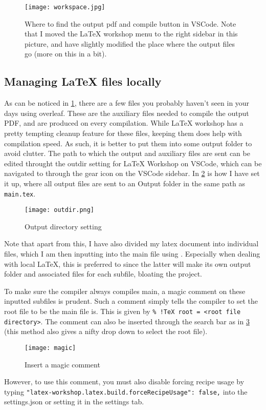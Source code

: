 \begin{figure}[ht!]
    \centering
    \texttt{[image: workspace.jpg]}
    \caption{Where to find the output pdf and compile button in VSCode. Note that I moved the LaTeX workshop menu to the right sidebar in this picture, and have slightly modified the place where the output files go (more on this in a bit).}
    \label{fig:workspace}
\end{figure}


\newpage
\subsection{Managing \LaTeX{} files locally}

As can be noticed in \cref{fig:workspace}, there are a few files you probably haven't seen in your days using overleaf. These are the auxiliary files needed to compile the output PDF, and are produced on every compilation. While LaTeX workshop has a pretty tempting cleanup feature for these files, keeping them does help with compilation speed. As such, it is better to put them into some output folder to avoid clutter. The path to which the output and auxiliary files are sent can be edited throught the outdir setting for LaTeX Workshop on VSCode, which can be navigated to through the gear icon on the VSCode sidebar. In \cref{fig:outdir} is how I have set it up, where all output files are sent to an Output folder in the same path as \verb|main.tex|.
\begin{figure}[ht!]
    \centering
    \texttt{[image: outdir.png]}
    \caption{Output directory setting}
    \label{fig:outdir}
\end{figure}

Note that apart from this, I have also divided my latex document into individual files, which I am then inputting into the main file using \verb||. Especially when dealing with local \LaTeX{}, this is preferred to \verb|| since the latter will make its own output folder and associated files for each subfile, bloating the project. 

To make sure the compiler always compiles main, a magic comment on these inputted subfiles is prudent. Such a comment simply tells the compiler to set the root file to be the main file is. This is given by \verb|% !TeX root = <root file directory>|. The comment can also be inserted through the search bar as in \cref{fig:magic} (this method also gives a nifty drop down to select the root file).
\begin{figure}[ht!]
    \centering
    \texttt{[image: magic]}
    \caption{Insert a magic comment}
    \label{fig:magic}
\end{figure}
However, to use this comment, you must also disable forcing recipe usage by typing \texttt{"latex-workshop.latex.build.forceRecipeUsage": false,} into the settings.json or setting it in the settings tab.

